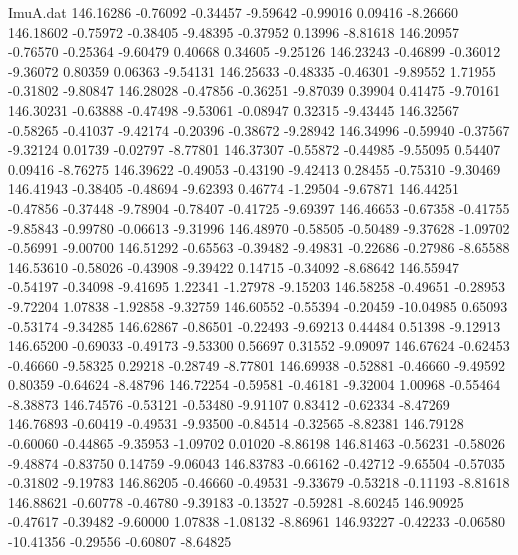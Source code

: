 \begin{filecontents}{ImuA.dat}
 146.16286   -0.76092   -0.34457   -9.59642   -0.99016    0.09416   -8.26660
 146.18602   -0.75972   -0.38405   -9.48395   -0.37952    0.13996   -8.81618
 146.20957   -0.76570   -0.25364   -9.60479    0.40668    0.34605   -9.25126
 146.23243   -0.46899   -0.36012   -9.36072    0.80359    0.06363   -9.54131
 146.25633   -0.48335   -0.46301   -9.89552    1.71955   -0.31802   -9.80847
 146.28028   -0.47856   -0.36251   -9.87039    0.39904    0.41475   -9.70161
 146.30231   -0.63888   -0.47498   -9.53061   -0.08947    0.32315   -9.43445
 146.32567   -0.58265   -0.41037   -9.42174   -0.20396   -0.38672   -9.28942
 146.34996   -0.59940   -0.37567   -9.32124    0.01739   -0.02797   -8.77801
 146.37307   -0.55872   -0.44985   -9.55095    0.54407    0.09416   -8.76275
 146.39622   -0.49053   -0.43190   -9.42413    0.28455   -0.75310   -9.30469
 146.41943   -0.38405   -0.48694   -9.62393    0.46774   -1.29504   -9.67871
 146.44251   -0.47856   -0.37448   -9.78904   -0.78407   -0.41725   -9.69397
 146.46653   -0.67358   -0.41755   -9.85843   -0.99780   -0.06613   -9.31996
 146.48970   -0.58505   -0.50489   -9.37628   -1.09702   -0.56991   -9.00700
 146.51292   -0.65563   -0.39482   -9.49831   -0.22686   -0.27986   -8.65588
 146.53610   -0.58026   -0.43908   -9.39422    0.14715   -0.34092   -8.68642
 146.55947   -0.54197   -0.34098   -9.41695    1.22341   -1.27978   -9.15203
 146.58258   -0.49651   -0.28953   -9.72204    1.07838   -1.92858   -9.32759
 146.60552   -0.55394   -0.20459  -10.04985    0.65093   -0.53174   -9.34285
 146.62867   -0.86501   -0.22493   -9.69213    0.44484    0.51398   -9.12913
 146.65200   -0.69033   -0.49173   -9.53300    0.56697    0.31552   -9.09097
 146.67624   -0.62453   -0.46660   -9.58325    0.29218   -0.28749   -8.77801
 146.69938   -0.52881   -0.46660   -9.49592    0.80359   -0.64624   -8.48796
 146.72254   -0.59581   -0.46181   -9.32004    1.00968   -0.55464   -8.38873
 146.74576   -0.53121   -0.53480   -9.91107    0.83412   -0.62334   -8.47269
 146.76893   -0.60419   -0.49531   -9.93500   -0.84514   -0.32565   -8.82381
 146.79128   -0.60060   -0.44865   -9.35953   -1.09702    0.01020   -8.86198
 146.81463   -0.56231   -0.58026   -9.48874   -0.83750    0.14759   -9.06043
 146.83783   -0.66162   -0.42712   -9.65504   -0.57035   -0.31802   -9.19783
 146.86205   -0.46660   -0.49531   -9.33679   -0.53218   -0.11193   -8.81618
 146.88621   -0.60778   -0.46780   -9.39183   -0.13527   -0.59281   -8.60245
 146.90925   -0.47617   -0.39482   -9.60000    1.07838   -1.08132   -8.86961
 146.93227   -0.42233   -0.06580  -10.41356   -0.29556   -0.60807   -8.64825

\end{filecontents}
